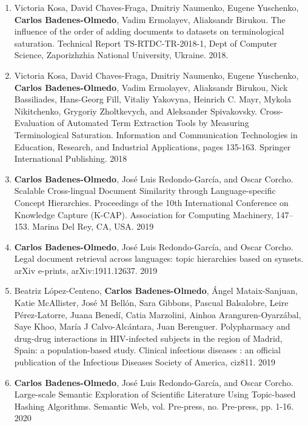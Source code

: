\begin{enumerate}
\item Victoria Kosa, David Chaves-Fraga, Dmitriy Naumenko, Eugene Yuschenko, \textbf{Carlos Badenes-Olmedo}, Vadim Ermolayev, Aliaksandr Birukou. The influence of the order of adding documents to datasets on terminological saturation. Technical Report TS-RTDC-TR-2018-1, Dept of Computer Science, Zaporizhzhia National University, Ukraine. 2018.
\item Victoria Kosa, David Chaves-Fraga, Dmitriy Naumenko, Eugene Yuschenko, \textbf{Carlos Badenes-Olmedo}, Vadim Ermolayev, Aliaksandr Birukou, Nick Bassiliades, Hans-Georg Fill, Vitaliy Yakovyna, Heinrich C. Mayr, Mykola Nikitchenko, Grygoriy Zholtkevych, and Aleksander Spivakovsky. Cross-Evaluation of Automated Term Extraction Tools by Measuring Terminological Saturation. Information and Communication Technologies in Education, Research, and Industrial Applications, pages 135-163. Springer International Publishing. 2018
\item \textbf{Carlos Badenes-Olmedo}, José Luis Redondo-García, and Oscar Corcho. Scalable Cross-lingual Document Similarity through Language-specific Concept Hierarchies. Proceedings of the 10th International Conference on Knowledge Capture (K-CAP). Association for Computing Machinery, 147–153. Marina Del Rey, CA, USA. 2019
\item \textbf{Carlos Badenes-Olmedo}, José Luis Redondo-García, and Oscar Corcho. Legal document retrieval across languages: topic hierarchies based on synsets. arXiv e-prints, arXiv:1911.12637. 2019
\item Beatriz López-Centeno, \textbf{Carlos Badenes-Olmedo}, Ángel Mataix-Sanjuan, Katie McAllister, José M Bellón, Sara Gibbons, Pascual Balsalobre, Leire Pérez-Latorre, Juana Benedí, Catia Marzolini, Ainhoa Aranguren-Oyarzábal, Saye Khoo, María J Calvo-Alcántara, Juan Berenguer. Polypharmacy and drug-drug interactions in HIV-infected subjects in the region of Madrid, Spain: a population-based study. Clinical infectious diseases : an official publication of the Infectious Diseases Society of America, ciz811. 2019
\item \textbf{Carlos Badenes-Olmedo}, José Luis Redondo-García, and Oscar Corcho. Large-scale Semantic Exploration of Scientific Literature Using Topic-based Hashing Algorithms. Semantic Web, vol. Pre-press, no. Pre-press, pp. 1-16. 2020
\end{enumerate}


